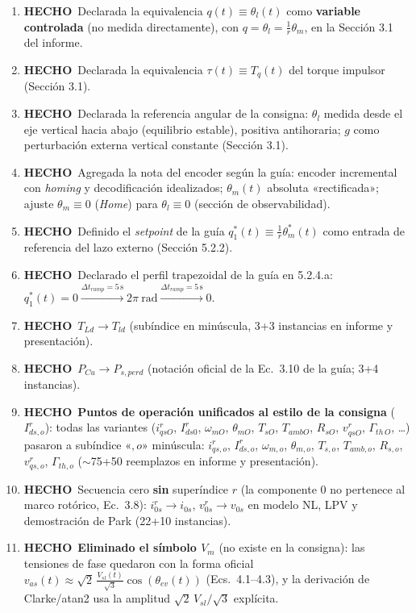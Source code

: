 \documentclass[11pt,a4paper]{article}
\newcommand{\hecho}{\textcolor{okgreen}{\textbf{HECHO}}}
\begin{document}
\begin{enumerate}[label=\textbf{ID \arabic*.}, leftmargin=1.6cm]
  \item \hecho\ Declarada la equivalencia $q(t)\equiv\theta_l(t)$ como \textbf{variable controlada} (no medida directamente), con $q=\theta_l=\frac{1}{r}\theta_m$, en la Sección 3.1 del informe.
  \item \hecho\ Declarada la equivalencia $\tau(t)\equiv T_q(t)$ del torque impulsor (Sección 3.1).
  \item \hecho\ Declarada la referencia angular de la consigna: $\theta_l$ medida desde el eje vertical hacia abajo (equilibrio estable), positiva antihoraria; $g$ como perturbación externa vertical constante (Sección 3.1).
  \item \hecho\ Agregada la nota del encoder según la guía: encoder incremental con \emph{homing} y decodificación idealizados; $\theta_m(t)$ absoluta «rectificada»; ajuste $\theta_m\equiv 0$ (\emph{Home}) para $\theta_l\equiv 0$ (sección de observabilidad).
  \item \hecho\ Definido el \emph{setpoint} de la guía $q_1^*(t)\equiv\frac{1}{r}\theta_m^*(t)$ como entrada de referencia del lazo externo (Sección 5.2.2).
  \item \hecho\ Declarado el perfil trapezoidal de la guía en 5.2.4.a: $q_1^*(t)=0 \xrightarrow{\Delta t_{ramp}=5\,\text{s}} 2\pi\ \text{rad} \xrightarrow{\Delta t_{ramp}=5\,\text{s}} 0$.
  \item \hecho\ $T_{Ld}\to T_{ld}$ (subíndice en minúscula, 3+3 instancias en informe y presentación).
  \item \hecho\ $P_{Cu}\to P_{s,perd}$ (notación oficial de la Ec.\ 3.10 de la guía; 3+4 instancias).
  \setcounter{enumi}{10}
  \item \hecho\ \textbf{Puntos de operación unificados al estilo de la consigna} ($I^r_{ds,o}$): todas las variantes ($i_{qsO}^r$, $I_{ds0}^r$, $\omega_{mO}$, $\theta_{mO}$, $T_{sO}$, $T_{ambO}$, $R_{sO}$, $v_{qsO}^r$, $\Gamma_{th\,O}$, \dots) pasaron a subíndice «$,o$» minúscula: $i^r_{qs,o}$, $I^r_{ds,o}$, $\omega_{m,o}$, $\theta_{m,o}$, $T_{s,o}$, $T_{amb,o}$, $R_{s,o}$, $v^r_{qs,o}$, $\Gamma_{th,o}$ ($\sim$75+50 reemplazos en informe y presentación).
  \item \hecho\ Secuencia cero \textbf{sin} superíndice $r$ (la componente $0$ no pertenece al marco rotórico, Ec.\ 3.8): $i_{0s}^r\to i_{0s}$, $v_{0s}^r\to v_{0s}$ en modelo NL, LPV y demostración de Park (22+10 instancias).
  \item \hecho\ \textbf{Eliminado el símbolo $V_m$} (no existe en la consigna): las tensiones de fase quedaron con la forma oficial $v_{as}(t)\approx\sqrt{2}\,\frac{V_{sl}(t)}{\sqrt{3}}\cos(\theta_{ev}(t))$ (Ecs.\ 4.1--4.3), y la derivación de Clarke/atan2 usa la amplitud $\sqrt{2}\,V_{sl}/\sqrt{3}$ explícita.

\end{enumerate}
\end{document}
